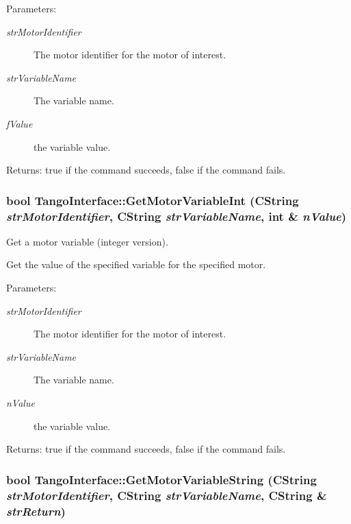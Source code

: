 \begin{Desc}
\item[Parameters:]
\begin{description}
\item[{\em strMotorIdentifier}]The motor identifier for the motor of interest.\item[{\em strVariableName}]The variable name. \item[{\em fValue}]the variable value. \end{description}
\end{Desc}


\begin{Desc}
\item[Returns:]true if the command succeeds, false if the command fails. \end{Desc}
\hypertarget{classTangoInterface_22a22602be1fef00ab7376be40b58ff4}{
\subsubsection[GetMotorVariableInt]{\setlength{\rightskip}{0pt plus 5cm}bool TangoInterface::GetMotorVariableInt (CString {\em strMotorIdentifier}, \/  CString {\em strVariableName}, \/  int \& {\em nValue})}}
\label{classTangoInterface_22a22602be1fef00ab7376be40b58ff4}


Get a motor variable (integer version). 

Get the value of the specified variable for the specified motor.

\begin{Desc}
\item[Parameters:]
\begin{description}
\item[{\em strMotorIdentifier}]The motor identifier for the motor of interest.\item[{\em strVariableName}]The variable name. \item[{\em nValue}]the variable value. \end{description}
\end{Desc}


\begin{Desc}
\item[Returns:]true if the command succeeds, false if the command fails. \end{Desc}
\hypertarget{classTangoInterface_2d5610cce92ea977ad74202219b1a0af}{
\subsubsection[GetMotorVariableString]{\setlength{\rightskip}{0pt plus 5cm}bool TangoInterface::GetMotorVariableString (CString {\em strMotorIdentifier}, \/  CString {\em strVariableName}, \/  CString \& {\em strReturn})}}
\label{classTangoInterface_2d5610cce92ea977ad74202219b1a0af}


